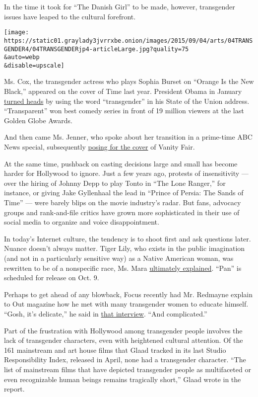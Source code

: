 In the time it took for ``The Danish Girl'' to be made, however,
transgender issues have leaped to the cultural forefront.

\texttt{[image: https://static01.graylady3jvrrxbe.onion/images/2015/09/04/arts/04TRANSGENDER4/04TRANSGENDERjp4-articleLarge.jpg?quality=75\\\&auto=webp\\\&disable=upscale]}

Ms. Cox, the transgender actress who plays Sophia Burset on ``Orange Is
the New Black,'' appeared on the cover of Time last year. President
Obama in January
\href{http://www.cnn.com/2015/01/20/politics/obama-transgender-sotu/}{turned
heads} by using the word ``transgender'' in his State of the Union
address. ``Transparent'' won best comedy series in front of 19 million
viewers at the last Golden Globe Awards.

And then came Ms. Jenner, who spoke about her transition in a prime-time
ABC News special, subsequently
\href{http://www.nytimes3xbfgragh.onion/2015/06/02/business/media/jenner-reveals-new-name-in-vanity-fair-article.html}{posing
for the cover} of Vanity Fair.

At the same time, pushback on casting decisions large and small has
become harder for Hollywood to ignore. Just a few years ago, protests of
insensitivity --- over the hiring of Johnny Depp to play Tonto in ``The
Lone Ranger,'' for instance, or giving Jake Gyllenhaal the lead in
``Prince of Persia: The Sands of Time'' --- were barely blips on the
movie industry's radar. But fans, advocacy groups and rank-and-file
critics have grown more sophisticated in their use of social media to
organize and voice disappointment.

In today's Internet culture, the tendency is to shoot first and ask
questions later. Nuance doesn't always matter. Tiger Lily, who exists in
the public imagination (and not in a particularly sensitive way) as a
Native American woman, was rewritten to be of a nonspecific race, Ms.
Mara
\href{http://www.cinemablend.com/new/Why-White-Tiger-Lily-Works-According-Rooney-Mara-70870.html}{ultimately
explained}. ``Pan'' is scheduled for release on Oct. 9.

Perhaps to get ahead of any blowback, Focus recently had Mr. Redmayne
explain to Out magazine how he met with many transgender women to
educate himself. ``Gosh, it's delicate,'' he said in
\href{http://www.out.com/movies/2015/8/11/eddie-redmayne-education}{that
interview}. ``And complicated.''

Part of the frustration with Hollywood among transgender people involves
the lack of transgender characters, even with heightened cultural
attention. Of the 161 mainstream and art house films that Glaad tracked
in its last Studio Responsibility Index, released in April, none had a
transgender character. ``The list of mainstream films that have depicted
transgender people as multifaceted or even recognizable human beings
remains tragically short,'' Glaad wrote in the report.


